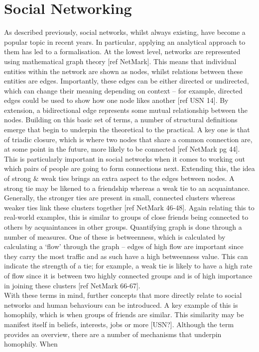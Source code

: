 \documentclass[]{report}
\begin{document}
\section{Social Networking}
As described previously, social networks, whilst always existing, have become a popular topic in recent years. In particular, applying an analytical approach to them has led to a formalisation. At the lowest level, networks are represented using mathematical graph theory [ref NetMark]. This means that individual entities within the network are shown as nodes, whilst relations between these entities are edges. Importantly, these edges can be either directed or undirected, which can change their meaning depending on context – for example, directed edges could be used to show how one node likes another [ref USN 14]. By extension, a bidirectional edge represents some mutual relationship between the nodes.
Building on this basic set of terms, a number of structural definitions emerge that begin to underpin the theoretical to the practical. A key one is that of triadic closure, which is where two nodes that share a common connection are, at some point in the future, more likely to be connected [ref NetMark pg 44]. This is particularly important in social networks when it comes to working out which pairs of people are going to form connections next. Extending this, the idea of strong \& weak ties brings an extra aspect to the edges between nodes. A strong tie may be likened to a friendship whereas a weak tie to an acquaintance. Generally, the stronger ties are present in small, connected clusters whereas weaker ties link these clusters together [ref NetMark 46-48]. Again relating this to real-world examples, this is similar to groups of close friends being connected to others by acquaintances in other groups. Quantifying graph is done through a number of measures. One of these is betweenness, which is calculated by calculating a `flow' through the graph – edges of high flow are important since they carry the most traffic and as such have a high betweenness value. This can indicate the strength of a tie; for example, a weak tie is likely to have a high rate of flow since it is between two highly connected groups and is of high importance in joining these clusters [ref NetMark 66-67].  \\
With these terms in mind, further concepts that more directly relate to social networks and human behaviours can be introduced. A key example of this is homophily, which is when groups of friends are similar. This similarity may be manifest itself in beliefs, interests, jobs or more [USN?]. Although the term provides an overview, there are a number of mechanisms that underpin homophily. When
\end{document}
